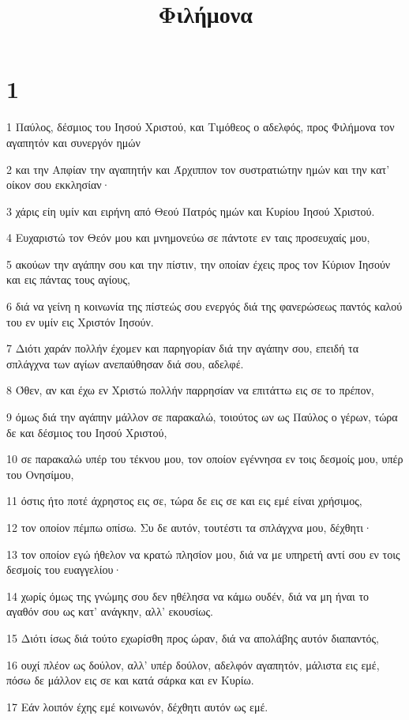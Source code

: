 

\title{Φιλήμονα}


\chapter{1}

\par 1 Παύλος, δέσμιος του Ιησού Χριστού, και Τιμόθεος ο αδελφός, προς Φιλήμονα τον αγαπητόν και συνεργόν ημών
\par 2 και την Απφίαν την αγαπητήν και Άρχιππον τον συστρατιώτην ημών και την κατ' οίκον σου εκκλησίαν·
\par 3 χάρις είη υμίν και ειρήνη από Θεού Πατρός ημών και Κυρίου Ιησού Χριστού.
\par 4 Ευχαριστώ τον Θεόν μου και μνημονεύω σε πάντοτε εν ταις προσευχαίς μου,
\par 5 ακούων την αγάπην σου και την πίστιν, την οποίαν έχεις προς τον Κύριον Ιησούν και εις πάντας τους αγίους,
\par 6 διά να γείνη η κοινωνία της πίστεώς σου ενεργός διά της φανερώσεως παντός καλού του εν υμίν εις Χριστόν Ιησούν.
\par 7 Διότι χαράν πολλήν έχομεν και παρηγορίαν διά την αγάπην σου, επειδή τα σπλάγχνα των αγίων ανεπαύθησαν διά σου, αδελφέ.
\par 8 Όθεν, αν και έχω εν Χριστώ πολλήν παρρησίαν να επιτάττω εις σε το πρέπον,
\par 9 όμως διά την αγάπην μάλλον σε παρακαλώ, τοιούτος ων ως Παύλος ο γέρων, τώρα δε και δέσμιος του Ιησού Χριστού,
\par 10 σε παρακαλώ υπέρ του τέκνου μου, τον οποίον εγέννησα εν τοις δεσμοίς μου, υπέρ του Ονησίμου,
\par 11 όστις ήτο ποτέ άχρηστος εις σε, τώρα δε εις σε και εις εμέ είναι χρήσιμος,
\par 12 τον οποίον πέμπω οπίσω. Συ δε αυτόν, τουτέστι τα σπλάγχνα μου, δέχθητι·
\par 13 τον οποίον εγώ ήθελον να κρατώ πλησίον μου, διά να με υπηρετή αντί σου εν τοις δεσμοίς του ευαγγελίου·
\par 14 χωρίς όμως της γνώμης σου δεν ηθέλησα να κάμω ουδέν, διά να μη ήναι το αγαθόν σου ως κατ' ανάγκην, αλλ' εκουσίως.
\par 15 Διότι ίσως διά τούτο εχωρίσθη προς ώραν, διά να απολάβης αυτόν διαπαντός,
\par 16 ουχί πλέον ως δούλον, αλλ' υπέρ δούλον, αδελφόν αγαπητόν, μάλιστα εις εμέ, πόσω δε μάλλον εις σε και κατά σάρκα και εν Κυρίω.
\par 17 Εάν λοιπόν έχης εμέ κοινωνόν, δέχθητι αυτόν ως εμέ.
